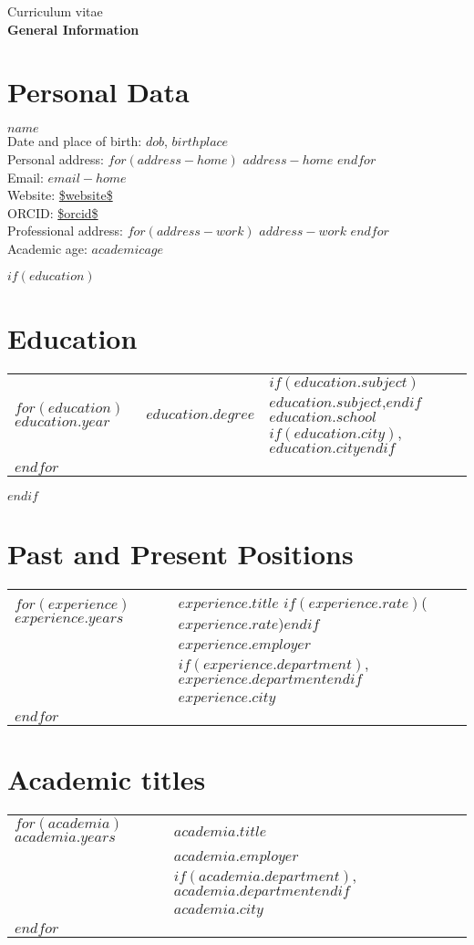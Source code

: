 \documentclass[martgin, line, 11pt]{article}
\begin{document}
\begin{flushright}
  {\large Curriculum vitae}\\
  {\large \textbf{General Information}}
\end{flushright}

\section*{Personal Data}
{\large \textbf{$name$}}\\
Date and place of birth: $dob$, $birthplace$\\
Personal address: 
$for(address-home)$
  $address-home$
$endfor$\\
Email: \href{mailto:$email-home$}{$email-home$}\\
Website: \url{$website$}\\
ORCID: \url{$orcid$}\\
Professional address: 
$for(address-work)$
  $address-work$
$endfor$\\
Academic age: $academicage$

$if(education)$
\section*{Education}
\noindent
\begin{tabular}{lll}
$for(education)$
$education.year$&$education.degree$&
$if(education.subject)$$education.subject$,$endif$
$education.school$$if(education.city)$, $education.city$$endif$\\
$endfor$
\end{tabular}
$endif$

\section*{Past and Present Positions}
\noindent
\begin{tabular}{ll}
$for(experience)$
$experience.years$&$experience.title$ $if(experience.rate)$($experience.rate$)$endif$\\
&$experience.employer$$if(experience.department)$, $experience.department$$endif$\\
&$experience.city$\\
$endfor$
\end{tabular}

\section*{Academic titles}
\noindent
\begin{tabular}{ll}
$for(academia)$
 $academia.years$&$academia.title$\\
 &$academia.employer$$if(academia.department)$, $academia.department$$endif$\\
 &$academia.city$\\
$endfor$
\end{tabular}
\end{document}
